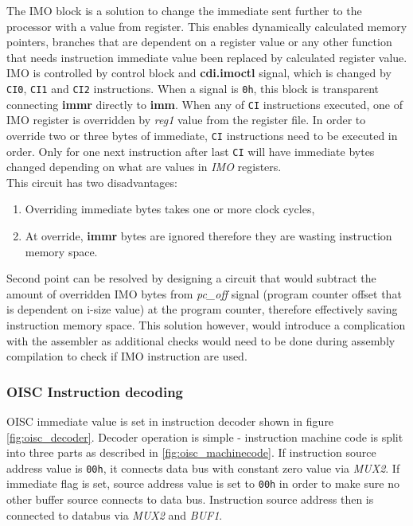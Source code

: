 The IMO block is a solution to change the immediate sent further to the processor with a value from register. This enables dynamically calculated memory pointers, branches that are dependent on a register value or any other function that needs instruction immediate value been replaced by calculated register value. IMO is controlled by control block and \textbf{cdi.imoctl} signal, which is changed by \texttt{CI0}, \texttt{CI1} and \texttt{CI2} instructions. When a signal is \texttt{0h}, this block is transparent connecting \textbf{immr} directly to \textbf{imm}. When any of \texttt{CI} instructions executed, one of IMO register is overridden by \textit{reg1} value from the register file. In order to override two or three bytes of immediate, \texttt{CI} instructions need to be executed in order. Only for one next instruction after last \texttt{CI} will have immediate bytes changed depending on what are values in \textit{IMO} registers.
\\This circuit has two disadvantages: 
\begin{enumerate}
	\item Overriding immediate bytes takes one or more clock cycles,
	\item At override, \textbf{immr} bytes are ignored therefore they are wasting instruction memory space.
\end{enumerate}
Second point can be resolved by designing a circuit that would subtract the amount of overridden IMO bytes from \textit{pc\_off} signal (program counter offset that is dependent on i-size value) at the program counter, therefore effectively saving instruction memory space. This solution however, would introduce a complication with the assembler as additional checks would need to be done during assembly compilation to check if IMO instruction are used.

\subsubsection{OISC Instruction decoding}
OISC immediate value is set in instruction decoder shown in figure \ref{fig:oisc_decoder}. Decoder operation is simple - instruction machine code is split into three parts as described in \ref{fig:oisc_machinecode}. If instruction source address value is \texttt{00h}, it connects data bus with constant zero value via \textit{MUX2}. If immediate flag is set, source address value is set to \texttt{00h} in order to make sure no other buffer source connects to data bus. Instruction source address then is connected to databus via \textit{MUX2} and \textit{BUF1}. 


